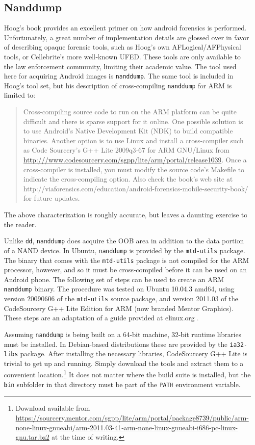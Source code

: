 \subsection{Nanddump}
Hoog's book provides an excellent primer on how android forensics is performed.  Unfortunately, a great number of
implementation details are glossed over in favor of describing opaque forensic tools, such as Hoog's own AFLogical/AFPhysical tools,
or Cellebrite's more well-known UFED. These tools are only available to the law enforcement community, limiting their academic
value. The tool used here for acquiring Android images is \texttt{nanddump}. The same tool is included in Hoog's tool set, but his
description of cross-compiling \texttt{nanddump} for ARM is limited to: \begin{quote} Cross-compiling source code to run on the ARM
platform can be quite difficult and there is sparse support for it online.  One possible solution is to use Android's Native
Development Kit (NDK) to build compatible binaries.  Another option is to use Linux and install a cross-compiler such as Code
Sourcery's G++ Lite 2009q3-67 for ARM GNU/Linux from \url{http:///www.codesourcery.com/sgpp/lite/arm/portal/release1039}.  Once a
cross-compiler is installed, you must modify the source code's Makefile to indicate the cross-compiling option.  Also check the
book's web site at http://viaforensics.com/education/android-forensics-mobile-security-book/ for future updates.

\hspace{\fill}\cite{hoog}
\end{quote}
The above characterization is roughly accurate, but leaves a daunting exercise to the reader. 

Unlike \texttt{dd}, \texttt{nanddump} does acquire the OOB area in addition to the data portion of a NAND device.  In Ubuntu,
\texttt{nanddump} is provided by the \texttt{mtd-utils} package.  The binary that comes with the \texttt{mtd-utils} package is not
compiled for the ARM processor, however, and so it must be cross-compiled before it can be used on an Android phone.  The following
set of steps can be used to create an ARM \texttt{nanddump} binary.  The procedure was tested on Ubuntu 10.04.3 amd64, using version
20090606 of the \texttt{mtd-utils} source package, and version 2011.03 of the CodeSourcery G++ Lite Edition for ARM (now branded
Mentor Graphics).  These steps are an adaptation of a guide provided at elinux.org \cite{compilingmtd}.

Assuming \texttt{nanddump} is being built on a 64-bit machine, 32-bit runtime libraries must be installed.  In Debian-based
distributions these are provided by the \texttt{ia32-libs} package.  After installing the necessary libraries, CodeSourcery G++ Lite
is trivial to get up and running.  Simply download the tools and extract them to a convenient location.\footnote{Download available
from
\url{https://sourcery.mentor.com/sgpp/lite/arm/portal/package8739/public/arm-none-linux-gnueabi/arm-2011.03-41-arm-none-linux-gnueabi-i686-pc-linux-gnu.tar.bz2}
at the time of writing.} It does not matter where the build suite is installed, but the \texttt{bin} subfolder in that directory
must be part of the \texttt{PATH} environment variable.

